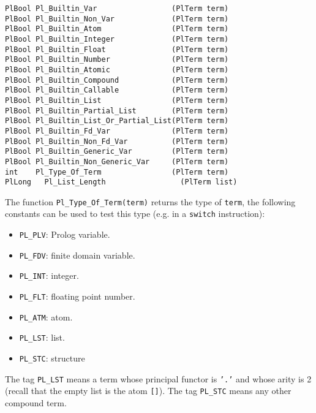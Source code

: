 \begin{Indentation}
\begin{verbatim}
PlBool Pl_Builtin_Var                 (PlTerm term)
PlBool Pl_Builtin_Non_Var             (PlTerm term)
PlBool Pl_Builtin_Atom                (PlTerm term)
PlBool Pl_Builtin_Integer             (PlTerm term)
PlBool Pl_Builtin_Float               (PlTerm term)
PlBool Pl_Builtin_Number              (PlTerm term)
PlBool Pl_Builtin_Atomic              (PlTerm term)
PlBool Pl_Builtin_Compound            (PlTerm term)
PlBool Pl_Builtin_Callable            (PlTerm term)
PlBool Pl_Builtin_List                (PlTerm term)
PlBool Pl_Builtin_Partial_List        (PlTerm term)
PlBool Pl_Builtin_List_Or_Partial_List(PlTerm term)
PlBool Pl_Builtin_Fd_Var              (PlTerm term)
PlBool Pl_Builtin_Non_Fd_Var          (PlTerm term)
PlBool Pl_Builtin_Generic_Var         (PlTerm term)
PlBool Pl_Builtin_Non_Generic_Var     (PlTerm term)
int    Pl_Type_Of_Term                (PlTerm term)
PlLong   Pl_List_Length                 (PlTerm list)
\end{verbatim}
\end{Indentation}

The function \texttt{Pl\_Type\_Of\_Term(term)} returns the type of
\texttt{term}, the following constants can be used to test this type (e.g.
in a \texttt{switch} instruction):

\begin{itemize}
\item \texttt{PL\_PLV}: Prolog variable.

\item \texttt{PL\_FDV}: finite domain variable.

\item \texttt{PL\_INT}: integer.

\item \texttt{PL\_FLT}: floating point number.

\item \texttt{PL\_ATM}: atom.

\item \texttt{PL\_LST}: list.

\item \texttt{PL\_STC}: structure
\end{itemize}

The tag \texttt{PL\_LST} means a term whose principal functor is \texttt{'.'}
and whose arity is 2 (recall that the empty list is the atom \texttt{[]}).
The tag \texttt{PL\_STC} means any other compound term.

